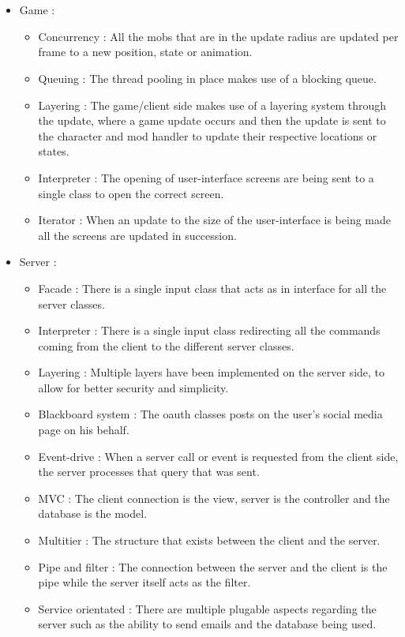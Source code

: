 \documentclass[letterpaper]{article}
\begin{document}
		\vspace{0.2in}
			
			
			
		\vspace{0.2in}
		\section*{\colorbox{blue}{}}
		\vspace{0.1in}
		\begin{itemize}
		\item Game :
		\begin{itemize}
		\item Concurrency : All the mobs that are in the update radius are updated per frame to a new position, state or animation.
		\item Queuing : The thread pooling in place makes use of a blocking queue.
		\item Layering : The game/client side makes use of a layering system through the update, where a game update occurs and then the update is sent to the character and mod handler to update their respective locations or states.
		\item Interpreter : The opening of user-interface screens are being sent to a single class to open the correct screen.
		\item Iterator : When an update to the size of the user-interface is being made all the screens are updated in succession.
		\end{itemize}
		\item Server :
		\begin{itemize}
		\item Facade : There is a single input class that acts as in interface for all the server classes.
		\item Interpreter : There is a single input class redirecting all the commands coming from the client to the different server classes.
		\item Layering : Multiple layers have been implemented on the server side, to allow for better security and simplicity.
		\item Blackboard system : The oauth classes posts on the user's social media page on his behalf.
		\item Event-drive : When a server call or event is requested from the client side, the server processes that query that was sent. 
		\item MVC : The client connection is the view, server is the controller and the database is the model.
		\item Multitier : The structure that exists between the client and the server.
		\item Pipe and filter : The connection between the server and the client is the pipe while the server itself acts as the filter.
		\item Service orientated : There are multiple plugable aspects regarding the server such as the ability to send emails and the database being used.
		\end{itemize}
		\end{itemize}
\end{document}
